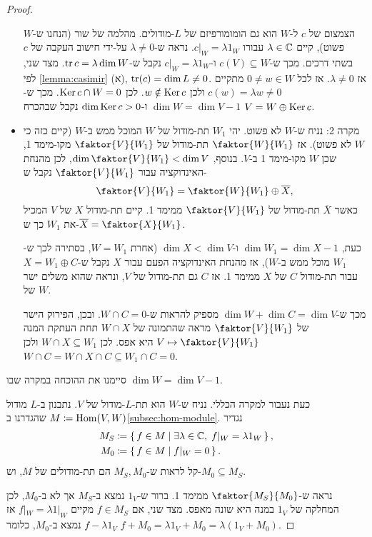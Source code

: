 \documentclass{report}
\theoremstyle{break}
\theoremstyle{MyNonumberbreak}
\newtheorem{proof}{הוכחה}
\begin{document}
\begin{proof}
\begin{itemize}
		הצמצום של $c$ ל-$W$ הוא גם הומומורפיזם של $L$-מודולים. מהלמה של שור (הנחנו ש-$W$ פשוט), קיים $\lambda \in \operatorname{\mathbb{C}}$ עבורו $c|_W = \lambda 1_W$. נראה ש-$\lambda \neq 0$ על-ידי חישוב העקבה של $c$ בשתי דרכים. מכך ש-$c(V) \subseteq W$ ו-$c|_W = \lambda 1_W$ נקבל ש-$\operatorname{tr} c = \lambda\dim W$. מצד שני, לפי \autoref*{lemma:casimir} (א), $\operatorname{tr}(c) = \dim L \neq 0$. אז $\lambda \neq 0$. אז לכל $0 \neq w \in W$ מתקיים $c(w) = \lambda w \neq 0$ ולכן $w \notin \operatorname{Ker} c$. לכן $\operatorname{Ker} c \cap W = 0$. מכך ש-$\dim W = \dim V - 1$ ו-$\dim\operatorname{Ker} c > 0$ נקבל שבהכרח $V = W \oplus \operatorname{Ker} c$.
		\item
		מקרה 2: נניח ש-$W$ לא פשוט. יהי $W_1$ תת-מודול של $W$ המוכל ממש ב-$W$ (קיים כזה כי $W$ לא פשוט). אז $\faktor{W}{W_1}$ תת-מודול של $\faktor{V}{W_1}$ מקו-מימד 1, שכן $W$ מקו-מימד 1 ב-$V$. בנוסף, $\dim\faktor{V}{W_1} < \dim V$, לכן מהנחת האינדוקציה עבור $\faktor{V}{W_1}$ נקבל ש-
		\[ \faktor{V}{W_1} = \faktor{W}{W_1} \oplus \overline{X}, \]
		כאשר $\overline{X}$ תת-מודול של $\faktor{V}{W_1}$ ממימד 1. קיים תת-מודול $X$ של $V$ המכיל את $W_1$ כך ש-$\overline{X} = \faktor{X}{W_1}$.
		
		כעת, $\dim W_1 = \dim X - 1$ ו-$\dim X < \dim V$ (אחרת $W = W_1$, בסתירה לכך ש-$W_1$ מוכל ממש ב-$W$), אז מהנחת האינדוקציה הפעם עבור $X$ נקבל ש-$X = W_1 \oplus C$ עבור תת-מודול $C$ של $X$ ממימד 1. אז $C$ גם תת-מודול של $V$, ונראה שהוא משלים ישר של $W$.
		
		מכך ש-$\dim W + \dim C = \dim V$ מספיק להראות ש-$W \cap C = 0$. ובכן, הפירוק הישר של $\faktor{V}{W_1}$ מראה שהתמונה של $W \cap X$ תחת העתקת המנה $V \mapsto \faktor{V}{W_1}$ היא אפס. לכן $W \cap X \subseteq W_1$ ולכן	$W \cap C = W \cap X \cap C \subseteq W_1 \cap C = 0$.
	\end{itemize}
	סיימנו את ההוכחה במקרה שבו $\dim W = \dim V - 1$.
	
	כעת נעבור למקרה הכללי. נניח ש-$W$ הוא תת-$L$-מודול של $V$. נתבנון ב-$L$ מודול $M \coloneqq \operatorname{Hom}(V, W)$ שהגדרנו ב\autoref*{subsec:hom-module}. נגדיר
	\begin{align*}
		M_S &\coloneqq \set{f \in M | \exists \lambda \in \operatorname{\mathbb{C}}, \; f|_W = \lambda 1_W}, \\
		M_0 &\coloneqq \set{f \in M | f|_W = 0}.
	\end{align*}
	קל לראות ש-$M_S, M_0$ הם תת-מודולים של $M$, וש-$M_0 \subseteq M_S$.
	
	נראה ש-$\faktor{M_S}{M_0}$ ממימד 1. ברור ש-$1_V$ נמצא ב-$M_S$ אך לא ב-$M_0$, לכן המחלקה של $1_V$ במנה היא שונה מאפס. מצד שני, אם $f \in M_S$ מקיים $f|_W = \lambda 1|_W$ אז $f - \lambda 1_V$ נמצא ב-$M_0$, כלומר $f + M_0 = \lambda 1_V + M_0 = \lambda(1_V + M_0)$.
	

\end{proof}
\end{document}
